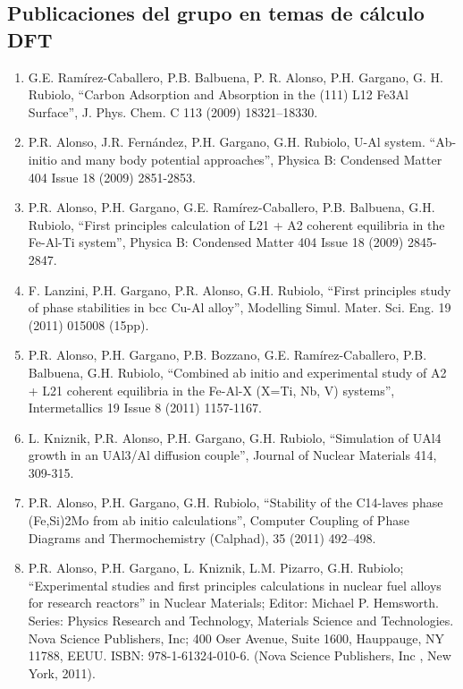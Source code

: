 \subsection{ Publicaciones del grupo en temas de cálculo DFT}

\begin{enumerate}
\item  G.E. Ramírez-Caballero, P.B. Balbuena, P. R. Alonso, P.H. Gargano, G. 
H. Rubiolo, ``Carbon Adsorption and Absorption in the (111) L12 Fe3Al Surface'', J. 
Phys. Chem. C 113 (2009) 18321–18330.

\item  P.R. Alonso, J.R. Fernández, P.H. Gargano, G.H. Rubiolo, U-Al system. 
``Ab-initio and many body potential approaches'', Physica B: Condensed Matter 404 
Issue 18 (2009) 2851-2853.

\item P.R. Alonso, P.H. Gargano, G.E. Ramírez-Caballero, P.B. Balbuena, G.H. 
Rubiolo, ``First principles calculation of L21 + A2 coherent equilibria in the 
Fe-Al-Ti system'', Physica B: Condensed Matter 404 Issue 18 (2009) 2845-2847. 

\item  F. Lanzini, P.H. Gargano, P.R. Alonso, G.H. Rubiolo, ``First principles 
study of phase stabilities in bcc Cu-Al alloy'', Modelling Simul. Mater. Sci. 
Eng. 19 (2011) 015008 (15pp).

\item  P.R. Alonso, P.H. Gargano, P.B. Bozzano, G.E. Ramírez-Caballero, P.B. 
Balbuena, G.H. Rubiolo, ``Combined ab initio and experimental study of A2 + L21 
coherent equilibria in the Fe-Al-X (X=Ti, Nb, V) systems'', Intermetallics 19 
Issue 8 (2011) 1157-1167. 

\item  L. Kniznik, P.R. Alonso, P.H. Gargano, G.H. Rubiolo, ``Simulation of 
UAl4 growth in an UAl3/Al diffusion couple'', Journal of Nuclear Materials 414, 
    309-315. 

\item  P.R. Alonso, P.H. Gargano, G.H. Rubiolo, ``Stability of the C14-laves 
phase (Fe,Si)2Mo from ab initio calculations'', Computer Coupling of Phase 
Diagrams and Thermochemistry (Calphad), 35 (2011) 492–498. 

\item  P.R. Alonso, P.H. Gargano, L. Kniznik, L.M. Pizarro, G.H. Rubiolo; 
``Experimental studies and first principles calculations in nuclear fuel alloys 
for research reactors'' in Nuclear Materials; Editor: Michael P. Hemsworth. 
Series: Physics Research and Technology, Materials Science and Technologies. 
Nova Science Publishers, Inc; 400 Oser Avenue, Suite 1600, Hauppauge, NY 11788, 
EEUU. ISBN: 978-1-61324-010-6. (Nova Science Publishers, Inc , New York, 2011).


\end{enumerate}
